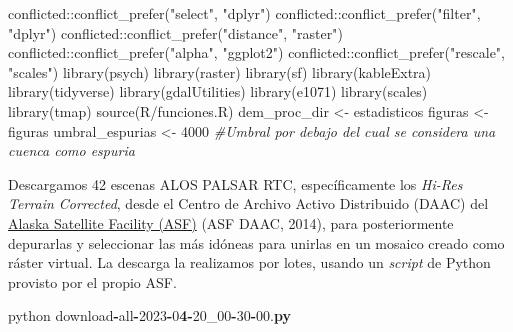 \documentclass[spanish]{article}
\newenvironment{Shaded}{\begin{snugshade}}{\end{snugshade}}
\newcommand{\BuiltInTok}[1]{#1}
\newcommand{\CommentTok}[1]{\textcolor[rgb]{0.56,0.35,0.01}{\textit{#1}}}
\newcommand{\DecValTok}[1]{\textcolor[rgb]{0.00,0.00,0.81}{#1}}
\newcommand{\ErrorTok}[1]{\textcolor[rgb]{0.64,0.00,0.00}{\textbf{#1}}}
\newcommand{\FloatTok}[1]{\textcolor[rgb]{0.00,0.00,0.81}{#1}}
\newcommand{\FunctionTok}[1]{\textcolor[rgb]{0.00,0.00,0.00}{#1}}
\newcommand{\NormalTok}[1]{#1}
\newcommand{\OperatorTok}[1]{\textcolor[rgb]{0.81,0.36,0.00}{\textbf{#1}}}
\newcommand{\OtherTok}[1]{\textcolor[rgb]{0.56,0.35,0.01}{#1}}
\newcommand{\SpecialCharTok}[1]{\textcolor[rgb]{0.00,0.00,0.00}{#1}}
\newcommand{\StringTok}[1]{\textcolor[rgb]{0.31,0.60,0.02}{#1}}
\begin{document}
\begin{Shaded}
\begin{Highlighting}[]
\NormalTok{conflicted}\SpecialCharTok{::}\FunctionTok{conflict\_prefer}\NormalTok{(}\StringTok{"select"}\NormalTok{, }\StringTok{"dplyr"}\NormalTok{)}
\NormalTok{conflicted}\SpecialCharTok{::}\FunctionTok{conflict\_prefer}\NormalTok{(}\StringTok{"filter"}\NormalTok{, }\StringTok{"dplyr"}\NormalTok{)}
\NormalTok{conflicted}\SpecialCharTok{::}\FunctionTok{conflict\_prefer}\NormalTok{(}\StringTok{"distance"}\NormalTok{, }\StringTok{"raster"}\NormalTok{)}
\NormalTok{conflicted}\SpecialCharTok{::}\FunctionTok{conflict\_prefer}\NormalTok{(}\StringTok{"alpha"}\NormalTok{, }\StringTok{"ggplot2"}\NormalTok{)}
\NormalTok{conflicted}\SpecialCharTok{::}\FunctionTok{conflict\_prefer}\NormalTok{(}\StringTok{"rescale"}\NormalTok{, }\StringTok{"scales"}\NormalTok{)}
\FunctionTok{library}\NormalTok{(psych)}
\FunctionTok{library}\NormalTok{(raster)}
\FunctionTok{library}\NormalTok{(sf)}
\FunctionTok{library}\NormalTok{(kableExtra)}
\FunctionTok{library}\NormalTok{(tidyverse)}
\FunctionTok{library}\NormalTok{(gdalUtilities)}
\FunctionTok{library}\NormalTok{(e1071)}
\FunctionTok{library}\NormalTok{(scales)}
\FunctionTok{library}\NormalTok{(tmap)}
\FunctionTok{source}\NormalTok{(}\StringTok{\textquotesingle{}R/funciones.R\textquotesingle{}}\NormalTok{)}
\NormalTok{dem\_proc\_dir }\OtherTok{\textless{}{-}} \StringTok{\textquotesingle{}estadisticos\textquotesingle{}}
\NormalTok{figuras }\OtherTok{\textless{}{-}} \StringTok{\textquotesingle{}figuras\textquotesingle{}}
\NormalTok{umbral\_espurias }\OtherTok{\textless{}{-}} \DecValTok{4000} \CommentTok{\#Umbral por debajo del cual se considera una cuenca como espuria}
\end{Highlighting}
\end{Shaded}

Descargamos 42 escenas ALOS PALSAR RTC, específicamente los \emph{Hi-Res
Terrain Corrected}, desde el Centro de Archivo Activo Distribuido (DAAC)
del \href{https://asf.alaska.edu/}{Alaska Satellite Facility (ASF)} (ASF
DAAC, 2014), para posteriormente depurarlas y seleccionar las más
idóneas para unirlas en un mosaico creado como ráster virtual. La
descarga la realizamos por lotes, usando un \emph{script} de Python
provisto por el propio ASF.

\begin{Shaded}
\begin{Highlighting}[]
\NormalTok{python download}\OperatorTok{{-}}\BuiltInTok{all}\OperatorTok{{-}}\DecValTok{2023}\OperatorTok{{-}}\DecValTok{0}\ErrorTok{4}\OperatorTok{{-}}\DecValTok{20\_00}\OperatorTok{{-}}\DecValTok{30}\OperatorTok{{-}}\FloatTok{00.}\ErrorTok{py}
\end{Highlighting}
\end{Shaded}
\end{document}
